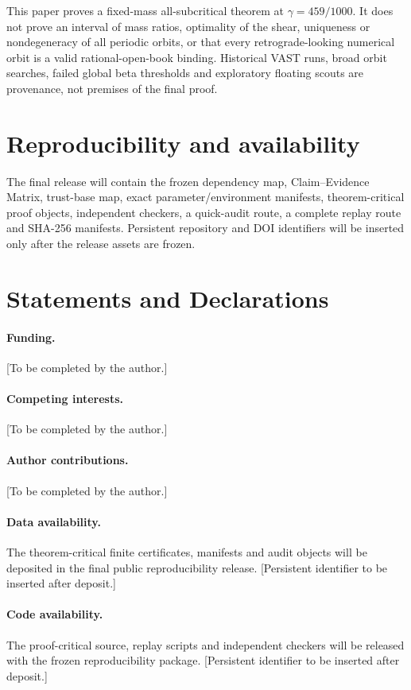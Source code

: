 \documentclass[11pt]{article}
\begin{document}
This paper proves a fixed-mass all-subcritical theorem at $\gamma=459/1000$. It does not prove an interval of mass ratios, optimality of the shear, uniqueness or nondegeneracy of all periodic orbits, or that every retrograde-looking numerical orbit is a valid rational-open-book binding. Historical VAST runs, broad orbit searches, failed global beta thresholds and exploratory floating scouts are provenance, not premises of the final proof.

\section{Reproducibility and availability}
The final release will contain the frozen dependency map, Claim--Evidence Matrix, trust-base map, exact parameter/environment manifests, theorem-critical proof objects, independent checkers, a quick-audit route, a complete replay route and SHA-256 manifests. Persistent repository and DOI identifiers will be inserted only after the release assets are frozen.

\section*{Statements and Declarations}
\paragraph{Funding.} [To be completed by the author.]
\paragraph{Competing interests.} [To be completed by the author.]
\paragraph{Author contributions.} [To be completed by the author.]
\paragraph{Data availability.} The theorem-critical finite certificates, manifests and audit objects will be deposited in the final public reproducibility release. [Persistent identifier to be inserted after deposit.]
\paragraph{Code availability.} The proof-critical source, replay scripts and independent checkers will be released with the frozen reproducibility package. [Persistent identifier to be inserted after deposit.]
\end{document}
